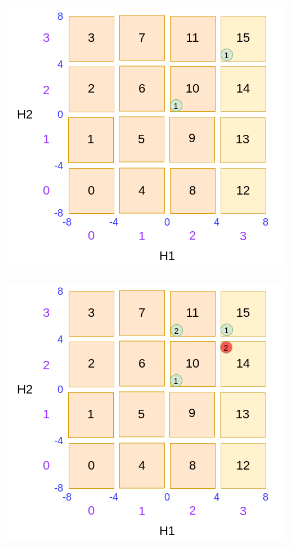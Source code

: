 \begin{figure}
\begin{subfigure}{0.45\textwidth}
		\caption{}
		\label{fig:dsbo-example-b}
	\end{subfigure}
	\begin{subfigure}{0.45\textwidth}
		\includegraphics[width=0.8\textwidth]{figures/draw/c.png}
		\caption{}
		\label{fig:dsbo-example-c}
	\end{subfigure}
	\begin{subfigure}{0.45\textwidth}
		\includegraphics[width=0.8\textwidth]{figures/draw/d.png}
		\caption{}
		\label{fig:dsbo-example-d}
	\end{subfigure}
	\begin{subfigure}{0.45\textwidth}

\end{subfigure}
\end{figure}
